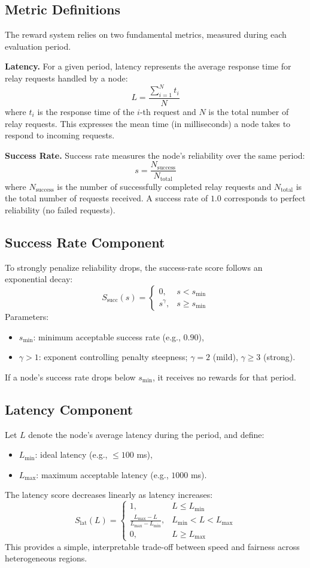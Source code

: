 \documentclass[10pt,twocolumn]{article}
\begin{document}
\subsection{Metric Definitions}
The reward system relies on two fundamental metrics, measured during each evaluation period.

\textbf{Latency.}
For a given period, latency represents the average response time for relay requests handled by a node:
\[
L = \frac{\sum_{i=1}^{N} t_i}{N}
\]
where $t_i$ is the response time of the $i$-th request and $N$ is the total number of relay requests.
This expresses the mean time (in milliseconds) a node takes to respond to incoming requests.

\textbf{Success Rate.}
Success rate measures the node's reliability over the same period:
\[
s = \frac{N_{\text{success}}}{N_{\text{total}}}
\]
where $N_{\text{success}}$ is the number of successfully completed relay requests and $N_{\text{total}}$ is the total number of requests received.
A success rate of $1.0$ corresponds to perfect reliability (no failed requests).

\subsection{Success Rate Component}
To strongly penalize reliability drops, the success-rate score follows an exponential decay:
\[
S_{\text{succ}}(s) =
\begin{cases}
0, & s < s_{\text{min}} \\
s^{\gamma}, & s \geq s_{\text{min}}
\end{cases}
\]
Parameters:
\begin{itemize}
    \item $s_{\text{min}}$: minimum acceptable success rate (e.g., $0.90$),
    \item $\gamma > 1$: exponent controlling penalty steepness; $\gamma = 2$ (mild), $\gamma \geq 3$ (strong).
\end{itemize}
If a node's success rate drops below $s_{\text{min}}$, it receives no rewards for that period.

\subsection{Latency Component}
Let $L$ denote the node's average latency during the period, and define:
\begin{itemize}
    \item $L_{\min}$: ideal latency (e.g., $\leq 100$ ms),
    \item $L_{\max}$: maximum acceptable latency (e.g., $1000$ ms).
\end{itemize}
The latency score decreases linearly as latency increases:
\[
S_{\text{lat}}(L) =
\begin{cases}
1, & L \leq L_{\min} \\
\frac{L_{\max} - L}{L_{\max} - L_{\min}}, & L_{\min} < L < L_{\max} \\
0, & L \geq L_{\max}
\end{cases}
\]
This provides a simple, interpretable trade-off between speed and fairness across heterogeneous regions.
\end{document}
